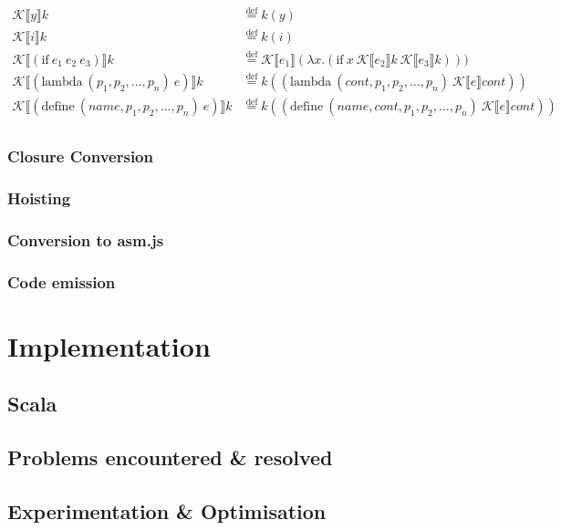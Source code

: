 \documentclass[11pt]{report}
\newcommand{\eqdef}{\stackrel{\text{def}}{=}}%
\newcommand{\cpstrans}[1]{\ensuremath{\mathcal{K}\llbracket #1 \rrbracket}}
\begin{document}
\begin{align*}
\cpstrans{y} k & \eqdef k(y) \\
\cpstrans{i} k & \eqdef k(i) \\
\cpstrans{(\text{if}\ e_1\ e_2\ e_3)} k & \eqdef \cpstrans{e_1} (\lambda x.(\text{if}\ x\ \cpstrans{e_2}k\ \cpstrans{e_3}k))) \\
\cpstrans{(\text{lambda}\ (p_1, p_2, \dots, p_n)\ e)} k & \eqdef k((\text{lambda}\ (cont, p_1, p_2, \dots, p_n)\ \cpstrans{e}cont)) \\
\cpstrans{(\text{define}\ (name, p_1, p_2, \dots, p_n)\ e)} k & \eqdef k((\text{define}\ (name, cont, p_1, p_2, \dots, p_n)\ \cpstrans{e}cont)) \\

\end{align*}

\subsection{Closure Conversion}
\subsection{Hoisting}
\subsection{Conversion to asm.js}
\subsection{Code emission}

\chapter{Implementation}
\section{Scala}
\section{Problems encountered \& resolved}
\section{Experimentation \& Optimisation}
\end{document}
